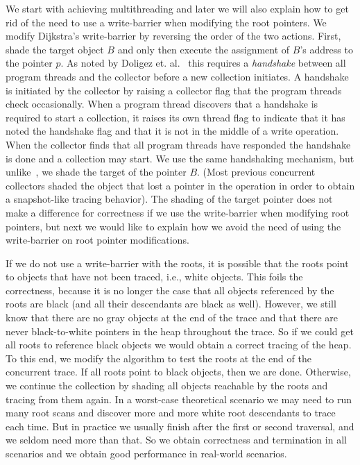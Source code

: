 We start with achieving multithreading and later we will also explain how to get rid of the need to use a write-barrier when modifying the root pointers. We modify Dijkstra's write-barrier by reversing the order of the two actions. First, shade the target object $B$ and only then execute the assignment of $B$'s address to the pointer $p$. As noted by Doligez et. al.~\cite{doli93,doli94} this requires a {\em handshake} between all program threads and the collector before a new collection initiates. A handshake is initiated by the collector by raising a collector flag that the program threads check occasionally. When a program thread discovers that a handshake is required to start a collection, it raises its own thread flag to indicate that it has noted the handshake flag and that it is not in the middle of a write operation. When the collector finds that all program threads have responded the handshake is done and a collection may start. We use the same handshaking mechanism, but unlike~\cite{doli93,doli94}, we shade the target of the pointer $B$. (Most previous  concurrent collectors shaded the object that lost a pointer in the operation in order to obtain a snapshot-like tracing behavior). The shading of the target pointer does not make a difference for
correctness if we use the write-barrier when modifying root pointers, but next we would like to explain how we avoid the need of using the write-barrier on root pointer modifications. 

If we do not use a write-barrier with the roots, it is possible that the roots point to objects that have not been traced, i.e., white objects. This foils the correctness, because it is no longer the case that all objects referenced by the roots are black (and all their descendants are black as well). However, we still know that there are no gray objects at the end of the trace and that there are never black-to-white pointers in the heap throughout the trace. So if we could get all roots to reference black objects we would obtain a correct tracing of the heap. To this end, we modify the algorithm to test the roots at the end of the concurrent trace. If all roots point to black objects, then we are done. Otherwise, we continue the collection by shading all objects reachable by the roots and tracing from them again. 
In a worst-case theoretical scenario we may need to run many root scans and discover more and more white root descendants to trace each time. 
But in practice we usually finish after the first or second traversal, and we seldom need more than that. So we obtain correctness and termination in all scenarios and we obtain good performance in real-world scenarios. 

